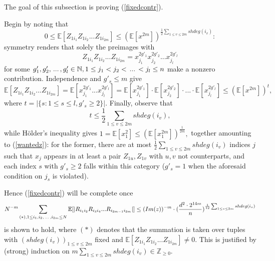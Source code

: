 \documentclass{article}
\numberwithin{equation}{section}
\begin{document}
The goal of this subsection is proving (\ref{fixedcontr}).
\par
Begin by noting that
\begin{equation}\label{wantedz}
    0 \leq \mathbb{E}[Z_{1i_1}Z_{1i_2}...Z_{1i_{2m}}] \leq (\mathbb{E}[x^{2m}])^{\frac{1}{2}\sum_{1 \leq v \leq 2m}{shdeg(i_v)}}:
\end{equation}
symmetry renders that solely the preimages with
\begin{equation}\label{square}
    Z_{1i_1}Z_{1i_2}...Z_{1i_{2m}}=x_{j_1}^{2g'_1} x_{j_2}^{2g'_2} ... x_{j_l}^{2g'_l}
\end{equation}
for some \(g'_1,g'_2,\hspace{0.05cm}...\hspace{0.05cm},g'_l \in \mathbb{N},1 \leq j_1<j_2<\hspace{0.05cm}...\hspace{0.05cm}<j_l \leq n\) make a nonzero contribution. Independence and \(g'_s \leq m\) give
\[\mathbb{E}[Z_{1i_1}Z_{1i_2}...Z_{1i_{2m}}]=\mathbb{E}[x_{j_1}^{2g'_1}...x_{j_l}^{2g'_l}]=\mathbb{E}[x_{j_1}^{2g'_1}] \cdot \mathbb{E}[x_{j_2}^{2g'_2}] \cdot ... \cdot \mathbb{E}[x_{j_l}^{2g'_l}] \leq (\mathbb{E}[x^{2m}])^{t},\]
where \(t=|\{s:1 \leq s \leq l, g'_s \geq 2\}|.\) Finally, observe that
\[t \leq \frac{1}{2}\sum_{1 \leq v \leq 2m}{shdeg(i_v)},\] 
while Hölder's inequality gives \(1=\mathbb{E}[x_1^2] \leq (\mathbb{E}[x_1^{2m}])^{\frac{1}{2m}},\) together amounting to (\ref{wantedz}): for the former, there are at most \(\frac{1}{2}\sum_{1 \leq v \leq 2m}{shdeg(i_v)}\) indices \(j\) such that \(x_{j}\) appears in at least a pair \(Z_{1u},Z_{1v}\) with \(u,v\) not counterparts, and each index \(s\) with \(g'_s \geq 2\) falls within this category (\(g'_s=1\) when the aforesaid condition on \(j_s\) is violated). 
\par
Hence (\ref{fixedcontr}) will be complete once
\begin{equation}\label{wantedbound}
    N^{-m}\sum_{(*),1 \leq i_1,i_2,\hspace{0.05cm}...\hspace{0.05cm},i_{2m} \leq N}{\mathbb{E}[|R_{i_1i_2}R_{i_3i_4}...R_{i_{2m-1}i_{2m}}|]} \leq (Im(z))^{-m} \cdot (\frac{d^2 \cdot 2^{14m}}{n})^{\frac{1}{12}\sum_{1 \leq v \leq 2m}{shdeg(i_v)}}
\end{equation}
is shown to hold, where \((*)\) denotes that the summation is taken over tuples with \((shdeg(i_v))_{1 \leq v \leq 2m}\) fixed and \(\mathbb{E}[Z_{1i_1}Z_{1i_2}...Z_{1i_{2m}}] \ne 0.\) This is justified by (strong) induction on \(m\sum_{1 \leq v \leq 2m}{shdeg(i_v)} \in \mathbb{Z}_{\geq 0}.\)
\end{document}
